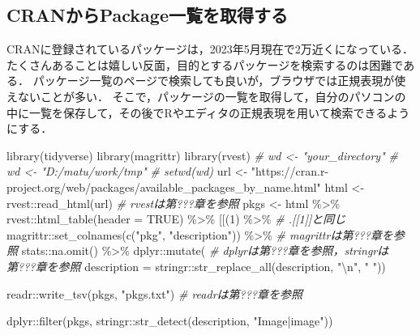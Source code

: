 \documentclass[
]{article}
\newenvironment{Shaded}{\begin{snugshade}}{\end{snugshade}}
\newcommand{\AttributeTok}[1]{\textcolor[rgb]{0.77,0.63,0.00}{#1}}
\newcommand{\CommentTok}[1]{\textcolor[rgb]{0.56,0.35,0.01}{\textit{#1}}}
\newcommand{\ConstantTok}[1]{\textcolor[rgb]{0.00,0.00,0.00}{#1}}
\newcommand{\DecValTok}[1]{\textcolor[rgb]{0.00,0.00,0.81}{#1}}
\newcommand{\FunctionTok}[1]{\textcolor[rgb]{0.00,0.00,0.00}{#1}}
\newcommand{\NormalTok}[1]{#1}
\newcommand{\OtherTok}[1]{\textcolor[rgb]{0.56,0.35,0.01}{#1}}
\newcommand{\SpecialCharTok}[1]{\textcolor[rgb]{0.00,0.00,0.00}{#1}}
\newcommand{\StringTok}[1]{\textcolor[rgb]{0.31,0.60,0.02}{#1}}
\begin{document}
\hypertarget{cranux304bux3089packageux4e00ux89a7ux3092ux53d6ux5f97ux3059ux308b}{%
\subsection{CRANからPackage一覧を取得する}\label{cranux304bux3089packageux4e00ux89a7ux3092ux53d6ux5f97ux3059ux308b}}

CRANに登録されているパッケージは，2023年5月現在で2万近くになっている．
たくさんあることは嬉しい反面，目的とするパッケージを検索するのは困難である．
パッケージ一覧のページで検索しても良いが，ブラウザでは正規表現が使えないことが多い．
そこで，パッケージの一覧を取得して，自分のパソコンの中に一覧を保存して，その後でRやエディタの正規表現を用いて検索できるようにする．

\begin{Shaded}
\begin{Highlighting}[]
\FunctionTok{library}\NormalTok{(tidyverse)}
\FunctionTok{library}\NormalTok{(magrittr)}
\FunctionTok{library}\NormalTok{(rvest)}
  \CommentTok{\# wd \textless{}{-} "your\_directory"}
  \CommentTok{\# wd \textless{}{-} "D:/matu/work/tmp"}
  \CommentTok{\# setwd(wd)}
\NormalTok{url }\OtherTok{\textless{}{-}} \StringTok{"https://cran.r{-}project.org/web/packages/available\_packages\_by\_name.html"}
\NormalTok{html }\OtherTok{\textless{}{-}}\NormalTok{ rvest}\SpecialCharTok{::}\FunctionTok{read\_html}\NormalTok{(url)  }\CommentTok{\# rvestは第???章を参照}
\NormalTok{pkgs }\OtherTok{\textless{}{-}}
\NormalTok{  html }\SpecialCharTok{\%\textgreater{}\%}
\NormalTok{  rvest}\SpecialCharTok{::}\FunctionTok{html\_table}\NormalTok{(}\AttributeTok{header =} \ConstantTok{TRUE}\NormalTok{) }\SpecialCharTok{\%\textgreater{}\%}
  \StringTok{\textasciigrave{}}\AttributeTok{[[}\StringTok{\textasciigrave{}}\NormalTok{(}\DecValTok{1}\NormalTok{) }\SpecialCharTok{\%\textgreater{}\%} \CommentTok{\# .[[1]]と同じ}
\NormalTok{  magrittr}\SpecialCharTok{::}\FunctionTok{set\_colnames}\NormalTok{(}\FunctionTok{c}\NormalTok{(}\StringTok{"pkg"}\NormalTok{, }\StringTok{"description"}\NormalTok{)) }\SpecialCharTok{\%\textgreater{}\%} \CommentTok{\# magrittrは第???章を参照}
\NormalTok{  stats}\SpecialCharTok{::}\FunctionTok{na.omit}\NormalTok{() }\SpecialCharTok{\%\textgreater{}\%}
\NormalTok{  dplyr}\SpecialCharTok{::}\FunctionTok{mutate}\NormalTok{( }\CommentTok{\# dplyrは第???章を参照，stringrは第???章を参照}
    \AttributeTok{description =}\NormalTok{ stringr}\SpecialCharTok{::}\FunctionTok{str\_replace\_all}\NormalTok{(description, }\StringTok{"}\SpecialCharTok{\textbackslash{}n}\StringTok{"}\NormalTok{, }\StringTok{" "}\NormalTok{))}

\NormalTok{readr}\SpecialCharTok{::}\FunctionTok{write\_tsv}\NormalTok{(pkgs, }\StringTok{"pkgs.txt"}\NormalTok{) }\CommentTok{\# readrは第???章を参照}

\NormalTok{dplyr}\SpecialCharTok{::}\FunctionTok{filter}\NormalTok{(pkgs, stringr}\SpecialCharTok{::}\FunctionTok{str\_detect}\NormalTok{(description, }\StringTok{"Image|image"}\NormalTok{))}
\end{Highlighting}
\end{Shaded}
\end{document}
